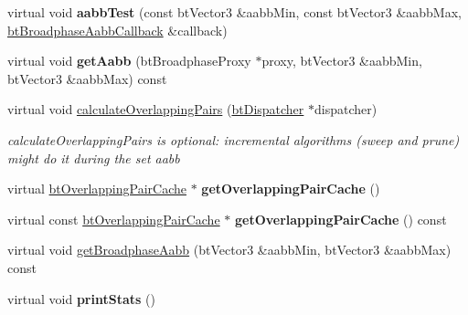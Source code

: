 \begin{DoxyCompactItemize}
\item 
\mbox{\label{structbtDbvtBroadphase_a910fd3065cf4d0ce828a84233fb5a18d}} 
virtual void {\bfseries aabb\+Test} (const bt\+Vector3 \&aabb\+Min, const bt\+Vector3 \&aabb\+Max, \hyperlink{structbtBroadphaseAabbCallback}{bt\+Broadphase\+Aabb\+Callback} \&callback)
\item 
\mbox{\label{structbtDbvtBroadphase_a35eeee50c78d45c59c086c8b91d7dbd6}} 
virtual void {\bfseries get\+Aabb} (bt\+Broadphase\+Proxy $\ast$proxy, bt\+Vector3 \&aabb\+Min, bt\+Vector3 \&aabb\+Max) const
\item 
\mbox{\label{structbtDbvtBroadphase_a182741d147d9810758c886ce86fb03e6}} 
virtual void \hyperlink{structbtDbvtBroadphase_a182741d147d9810758c886ce86fb03e6}{calculate\+Overlapping\+Pairs} (\hyperlink{classbtDispatcher}{bt\+Dispatcher} $\ast$dispatcher)
\begin{DoxyCompactList}\small\item\em calculate\+Overlapping\+Pairs is optional\+: incremental algorithms (sweep and prune) might do it during the set aabb \end{DoxyCompactList}\item 
\mbox{\label{structbtDbvtBroadphase_af1c5727aa0b6bb3592e827429790c411}} 
virtual \hyperlink{classbtOverlappingPairCache}{bt\+Overlapping\+Pair\+Cache} $\ast$ {\bfseries get\+Overlapping\+Pair\+Cache} ()
\item 
\mbox{\label{structbtDbvtBroadphase_a120dace9c8e69a97a29a7b6a88304f08}} 
virtual const \hyperlink{classbtOverlappingPairCache}{bt\+Overlapping\+Pair\+Cache} $\ast$ {\bfseries get\+Overlapping\+Pair\+Cache} () const
\item 
virtual void \hyperlink{structbtDbvtBroadphase_acbd595a9434b6bb045e15ab0d36120e3}{get\+Broadphase\+Aabb} (bt\+Vector3 \&aabb\+Min, bt\+Vector3 \&aabb\+Max) const
\item 
\mbox{\label{structbtDbvtBroadphase_ab31c707eac04e1c34111497ffd98c82a}} 
virtual void {\bfseries print\+Stats} ()
\item 
\mbox{\label{structbtDbvtBroadphase_a4d27a2ffb543aa23bb82fcf50ff25341}} 

\end{DoxyCompactItemize}
